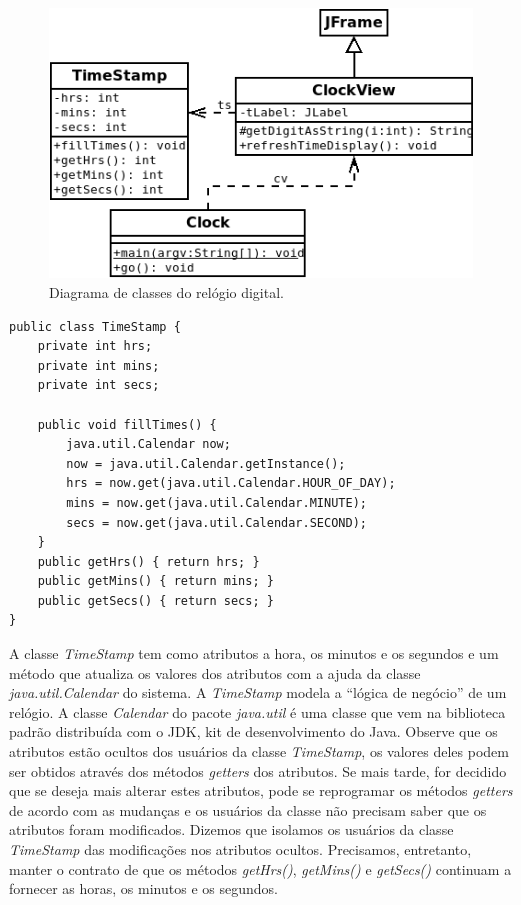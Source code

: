 \documentclass[
	11pt,				%
	openright,
	twoside,			%
	a4paper,			%
	english,			%
	french,
	brazil,				%
	sumario=tradicional
	]{abntex2}
\begin{document}
\begin{figure}[h]
\begin{center}
\includegraphics[scale=0.6]{clock.png} 
\caption{Diagrama de classes do relógio digital.} \label{fig:clock}
\end{center}
\end{figure}

\begin{verbatim}
public class TimeStamp {
    private int hrs;
    private int mins;
    private int secs;
    
    public void fillTimes() {
        java.util.Calendar now;
        now = java.util.Calendar.getInstance();
        hrs = now.get(java.util.Calendar.HOUR_OF_DAY);
        mins = now.get(java.util.Calendar.MINUTE);
        secs = now.get(java.util.Calendar.SECOND);
    }
    public getHrs() { return hrs; }
    public getMins() { return mins; }
    public getSecs() { return secs; }
}
\end{verbatim}

A classe \emph{TimeStamp} tem como atributos a hora, os minutos e os segundos e um método que atualiza os valores dos atributos com a ajuda da classe \emph{java.util.Calendar} do sistema. A \emph{TimeStamp} modela a ``lógica de negócio'' de um relógio. A classe \emph{Calendar} do pacote \emph{java.util} é uma classe que vem na biblioteca padrão distribuída com o JDK, kit de desenvolvimento do Java. Observe que os atributos estão ocultos dos usuários da classe \emph{TimeStamp}, os valores deles podem ser obtidos através dos métodos \textit{getters} dos atributos. Se mais tarde, for decidido que se deseja mais alterar estes atributos, pode se reprogramar os métodos \textit{getters} de acordo com as mudanças e os usuários da classe não precisam saber que os atributos foram modificados. Dizemos que isolamos os usuários da classe \emph{TimeStamp} das modificações nos atributos ocultos. Precisamos, entretanto, manter o contrato de que os métodos \emph{getHrs()}, \emph{getMins()} e \emph{getSecs()} continuam a fornecer as horas, os minutos e os segundos.
\end{document}
